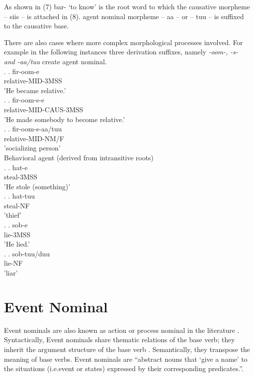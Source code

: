 \documentclass[11pt,a4paper]{article}
\begin{document}
As shown in (7) bar- ‘to know’ is the root word to which the causative morpheme – siis – is attached in (8). agent nominal morpheme – aa – or – tuu – is suffixed to the causative base. 

There are also cases where more complex morphological processes involved. For example in the following instances three derivation suffixes, namely \emph{-oom-, -s- and -aa/tuu} create agent nominal.\\

\ex.
\ag.
fir-oom-e \\
relative-MID-3MSS\\
'He became relative.'\\

\ex.
\ag.
fir-oom-s-e \\
relative-MID-CAUS-3MSS\\
'He made somebody to become relative.'\\

\ex.
\ag.
fir-oom-s-aa/tuu \\
relative-MID-NM/F\\
'socializing person'\\


Behavioral agent (derived from intransitive roots)\\

\ex.
\ag.
hat-e \\
steal-3MSS\\
'He stole (something)'\\

\ex.
\ag.
hat-tuu \\
steal-NF\\
'thief'\\

\ex.
\ag.
sob-e \\
lie-3MSS\\
'He lied.'\\

\ex.
\ag.
sob-tuu/duu \\
lie-NF\\
'liar'\\


\section{Event Nominal}
Event nominals are also known as action or process nominal in the literature \cite{siloni1997event}. Syntactically, Event nominals share thematic relations of the base verb; they inherit the argument structure of the base verb \cite{uth2015event,siloni1997event}. Semantically, they transpose the meaning of base verbs. Event nominals are “abstract nouns that ‘give a name’ to the situations (i.e.event or states) expressed by their corresponding predicates.”\cite{uth2015event}.
\end{document}
